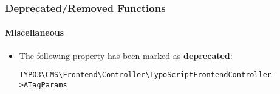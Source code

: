 %

\begin{frame}[fragile]
	\frametitle{Deprecated/Removed Functions}
	\framesubtitle{Miscellaneous}


	\begin{itemize}
		\item The following property has been marked as \textbf{deprecated}:
\begin{lstlisting}
TYPO3\CMS\Frontend\Controller\TypoScriptFrontendController->ATagParams
\end{lstlisting}
	\end{itemize}

\end{frame}

